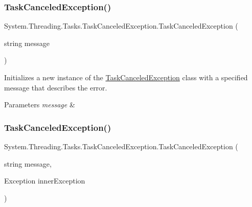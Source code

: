 \subsubsection{\texorpdfstring{Task\+Canceled\+Exception()}{TaskCanceledException()}\hspace{0.1cm}{\footnotesize\ttfamily [2/4]}}
{\footnotesize\ttfamily System.\+Threading.\+Tasks.\+Task\+Canceled\+Exception.\+Task\+Canceled\+Exception (\begin{DoxyParamCaption}\item[{string}]{message }\end{DoxyParamCaption})\hspace{0.3cm}{\ttfamily [inline]}}



Initializes a new instance of the \hyperlink{class_system_1_1_threading_1_1_tasks_1_1_task_canceled_exception}{Task\+Canceled\+Exception} class with a specified message that describes the error. 


\begin{DoxyParams}{Parameters}
{\em message} & \\
\hline
\end{DoxyParams}
\mbox{\label{class_system_1_1_threading_1_1_tasks_1_1_task_canceled_exception_a3ec415bbbefdfe9c9e1ef2ebd4f5fc32}} 
\subsubsection{\texorpdfstring{Task\+Canceled\+Exception()}{TaskCanceledException()}\hspace{0.1cm}{\footnotesize\ttfamily [3/4]}}
{\footnotesize\ttfamily System.\+Threading.\+Tasks.\+Task\+Canceled\+Exception.\+Task\+Canceled\+Exception (\begin{DoxyParamCaption}\item[{string}]{message,  }\item[{Exception}]{inner\+Exception }\end{DoxyParamCaption})\hspace{0.3cm}{\ttfamily [inline]}}



